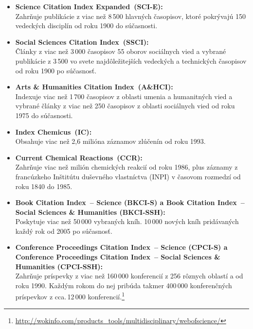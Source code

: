 \begin{itemize}

\item \textbf{Science Citation Index Expanded\R\ (SCI-E):}\\
  Zahrňuje publikácie z viac než 8\,500 hlavných časopisov, ktoré pokrývajú 150
  vedeckých disciplín od roku 1900 do súčasnosti.


\item \textbf{Social Sciences Citation Index\R\ (SSCI):}\\
  Články z viac než 3\,000 časopisov 55 oborov sociálnych vied a vybrané
  publikácie z 3\,500 vo svete najdôležitejších vedeckých a technických
  časopisov od roku 1900 po súčasnosť.


\item \textbf{Arts \& Humanities Citation Index\R\ (A\&HCI):}\\
  Indexuje viac než 1\,700 časopisov z oblasti umenia a humanitných vied a
  vybrané články z viac než 250 časopisov z oblasti sociálnych vied od roku 1975
  do súčasnosti.

\item \textbf{Index Chemicus\R\ (IC):}\\
  Obsahuje viac než 2,6 milióna záznamov zlúčenín od roku 1993.

\item \textbf{Current Chemical Reactions\R\ (CCR):}\\
  Zahrňuje viac než milión chemických reakcií od roku 1986, plus záznamy z
  francúzkeho Inštitútu duševného vlastníctva (INPI) v časovom rozmedzí od roku
  1840 do 1985.

\item \textbf{Book Citation Index\R\ -- Science (BKCI-S) a Book Citation Index\R\ -- Social Sciences \& Humanities (BKCI-SSH):}\\
  Poskytuje viac než 50\,000 vybraných kníh.  10\,000 nových kníh pridávaných
  každý rok od 2005 po súčasnosť.

\item \textbf{Conference Proceedings Citation Index\R\ -- Science (CPCI-S) a Conference Proceedings Citation Index\R\ -- Social Sciences \& Humanities (CPCI-SSH):}\\
  Zahrňuje príspevky z viac než 160\,000 konferencií z 256 rôznych oblastí
   a 
  od roku 1990.  Každým rokom do nej pribúda takmer 400\,000 konferenčných
  príspevkov z cca.\,12\,000
  konferencií.\footnote{\url{http://wokinfo.com/products_tools/multidisciplinary/webofscience/}}

\end{itemize}

